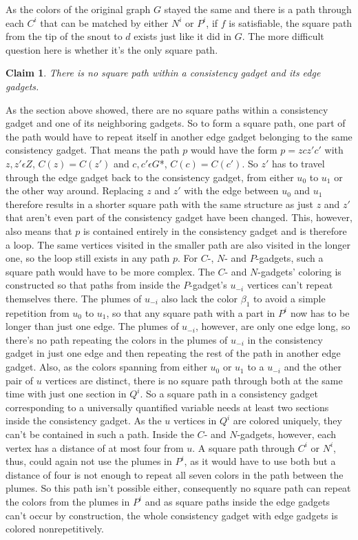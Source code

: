 \documentclass[12pt,a4paper]{article}
\newtheorem{claim}{Claim}
\begin{document}
As the colors of the original graph $G$ stayed the same and there is a path through each $C^i$ that can be matched by either $N^i$ or $P^i$, if $f$ is satisfiable, the square path from the tip of the snout to $d$ exists just like it did in $G$. The more difficult question here is whether it's the only square path.
\newline
\begin{claim}
There is no square path within a consistency gadget and its edge gadgets.
\end{claim}
As the section above showed, there are no square paths within a consistency gadget and one of its neighboring gadgets. So to form a square path, one part of the path would have to repeat itself in another edge gadget belonging to the same consistency gadget. That means the path $p$ would have the form $p = zcz'c'$ with $z, z' \epsilon Z$, $C(z) = C(z')$ and $c, c' \epsilon G$*, $C(c) = C(c')$. So $z'$ has to travel through the edge gadget back to the consistency gadget, from either $u_0$ to $u_1$ or the other way around. Replacing $z$ and $z'$ with the edge between $u_0$ and $u_1$ therefore results in a shorter square path with the same structure as just $z$ and $z'$ that aren't even part of the consistency gadget have been changed. This, however, also means that $p$ is contained entirely in the consistency gadget and is therefore a loop. The same vertices visited in the smaller path are also visited in the longer one, so the loop still exists in any path $p$.
\newline 
For $C$-, $N$- and $P$-gadgets, such a square path would have to be more complex. The $C$- and $N$-gadgets' coloring is constructed so that paths from inside the $P$-gadget's $u_{-i}$ vertices can't repeat themselves there. The plumes of $u_{-i}$ also lack the color $\beta_1$ to avoid a simple repetition from $u_0$ to $u_1$, so that any square path with a part in $P^i$ now has to be longer than just one edge. The plumes of $u_{-i}$, however, are only one edge long, so there's no path repeating the colors in the plumes of $u_{-i}$ in the consistency gadget in just one edge and then repeating the rest of the path in another edge gadget. Also, as the colors spanning from either $u_0$ or $u_1$ to a $u_{-i}$ and the other pair of $u$ vertices are distinct, there is no square path through both at the same time with just one section in $Q^i$. So a square path in a consistency gadget corresponding to a universally quantified variable needs at least two sections inside the consistency gadget. As the $u$ vertices in $Q^i$ are colored uniquely, they can't be contained in such a path. Inside the $C$- and $N$-gadgets, however, each vertex has a distance of at most four from $u$. A square path through $C^i$ or $N^i$, thus, could again not use the plumes in $P^i$, as it would have to use both but a distance of four is not enough to repeat all seven colors in the path between the plumes. So this path isn't possible either, consequently no square path can repeat the colors from the plumes in $P^i$ and as square paths inside the edge gadgets can't occur by construction, the whole consistency gadget with edge gadgets is colored nonrepetitively.
\end{document}
